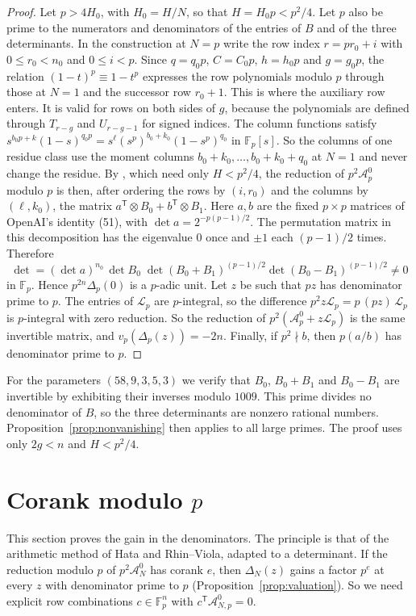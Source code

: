 \documentclass[11pt]{amsart}
\theoremstyle{definition}
\theoremstyle{remark}
\numberwithin{equation}{section}
\newcommand{\F}{\mathbb F}
\newcommand{\cA}{\mathcal A}
\newcommand{\cL}{\mathcal L}
\begin{document}
\begin{proof}
Let $p>4H_0$, with $H_0=H/N$, so that $H=H_0p<p^2/4$. Let $p$ also be prime to the numerators and
denominators of the entries of $B$ and of the three determinants. In the construction at $N=p$ write the
row index $r=pr_0+i$ with $0\le r_0<n_0$ and $0\le i<p$. Since $q=q_0p$, $C=C_0p$, $h=h_0p$ and $g=g_0p$,
the relation $(1-t)^{p}\equiv1-t^p$ expresses the row polynomials modulo $p$ through those at $N=1$ and the
successor row $r_0+1$. This is where the auxiliary row enters. It is valid for rows on both sides of $g$,
because the polynomials are defined through $T_{r-g}$ and $U_{r-g-1}$ for signed indices. The column
functions satisfy $s^{b_0p+k}(1-s)^{q_0p}=s^{\ell}(s^p)^{b_0+k_0}(1-s^p)^{q_0}$ in $\F_p[s]$. So the
columns of one residue class use the moment columns $b_0+k_0,\dots,b_0+k_0+q_0$ at $N=1$ and never change
the residue. By \cite[Lemma~3.1 and eqs.~(31), (35), (36)]{OpenAI2026}, which need only $H<p^2/4$, the
reduction of $p^2\cA^0_p$ modulo $p$ is then, after ordering the rows by $(i,r_0)$ and the columns by
$(\ell,k_0)$, the matrix $a^{\mathsf T}\otimes B_0+b^{\mathsf T}\otimes B_1$. Here $a,b$ are the fixed
$p\times p$ matrices of OpenAI's identity (51), with $\det a=2^{-p(p-1)/2}$. The permutation matrix in this
decomposition has the eigenvalue $0$ once and $\pm1$ each $(p-1)/2$ times. Therefore
\[
 \det=(\det a)^{n_0}\,\det B_0\;\det(B_0+B_1)^{(p-1)/2}\det(B_0-B_1)^{(p-1)/2}\ne0
\]
in $\F_p$. Hence $p^{2n}\Delta_p(0)$ is a $p$-adic unit. Let $z$ be such that $pz$ has denominator prime to
$p$. The entries of $\cL_p$ are $p$-integral, so the difference $p^2z\cL_p=p\,(pz)\,\cL_p$ is $p$-integral
with zero reduction. So the reduction of $p^2(\cA^0_p+z\cL_p)$ is the same invertible matrix, and
$v_p(\Delta_p(z))=-2n$. Finally, if $p^2\nmid b$, then $p(a/b)$ has denominator prime to $p$.
\end{proof}

For the parameters $(58,9,3,5,3)$ we verify that $B_0$, $B_0+B_1$ and $B_0-B_1$ are invertible by exhibiting
their inverses modulo $1009$. This prime divides no denominator of $B$, so the three determinants are
nonzero rational numbers. Proposition~\ref{prop:nonvanishing} then applies to all large primes. The proof
uses only $2g<n$ and $H<p^2/4$.
\section{Corank modulo $p$}\label{sec:content}

This section proves the gain in the denominators. The principle is that of the arithmetic method of Hata
and Rhin--Viola, adapted to a determinant. If the reduction modulo $p$ of $p^2\cA^0_N$ has corank $e$, then
$\Delta_N(z)$ gains a factor $p^e$ at every $z$ with denominator prime to $p$
(Proposition~\ref{prop:valuation}). So we need explicit row combinations $c\in\F_p^n$ with
$c^{\mathsf T}\cA^0_{N,p}=0$.
\end{document}
